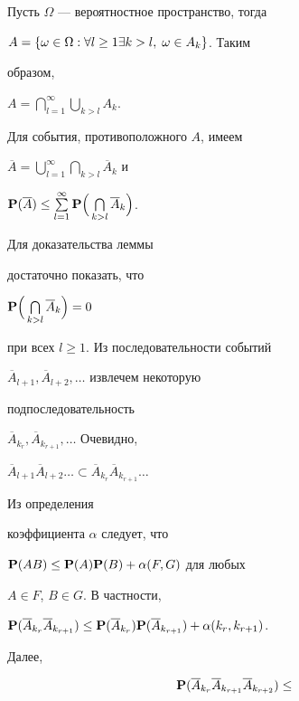 \begin{pf} Пусть $\Omega$ --- вероятностное пространство, тогда 


$A=\{\omega\in\Omega:\forall l\ge 1\linebreak %


\exists k>l,\;\omega\in A_k\}$. Таким 


образом, 


$A=\bigcap\limits^{\infty}_{l=1}\bigcup\limits_{k>l}A_k$. 


Для события, противоположного $A$, имеем 


$\overline A=\bigcup\limits^{\infty}_{l=1}\bigcap\limits_{k>l} 


\overline A_k$ и 


${\bold P}(\overline A)\le\sum\limits^{\infty}_{l=1} 


{\bold P}\Bigl(\,\bigcap\limits_{k>l}\overline A_k\Bigr)$. 


Для доказательства леммы 


достаточно показать, что 


${\bold P}\Bigl(\,\bigcap\limits_{k>l}\overline A_k\Bigr)=0$ 


при всех $l\ge 1$. Из последовательности событий 


$\overline A_{l+1},\overline A_{l+2},\dotsc$ извлечем некоторую 


подпоследовательность 


$\overline A_{k_r},\overline A_{k_{r+1}},\dotsc$ Очевидно, 


$\overline A_{l+1}\overline A_{l+2}\dotsc\subset\overline A_{k_r} 


\overline A_{k_{r+1}}\dotsc$ 


Из определения 


коэффициента $\alpha$ следует, что 


${\bold P}(AB)\le{\bold P}(A){\bold P}(B)+\alpha(F,G)$ для любых 


$A\in F$, $B\in G$. В частности, 


${\bold P}(\overline A_{k_r}\overline A_{k_{r+1}})\le{\bold P} 


(\overline A_{k_r}){\bold P}(\overline A_{k_{r+1}})+ 


\alpha(k_r,k_{r+1})$. 


Далее, 


\begin{gather*} 


{\bold P}(\overline A_{k_r}\overline A_{k_{r+1}}\overline A_{k_{r+2}})\le 



\end{gather*}
\end{pf}
